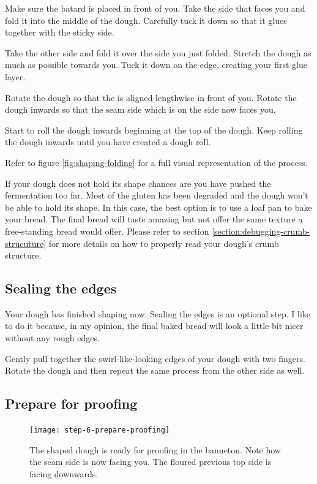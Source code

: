 Make sure the batard is placed in front of you. Take the side
that faces you and fold it into the middle of the dough. Carefully
tuck it down so that it glues together with the sticky side.

Take the other side and fold it over the side you just folded.
Stretch the dough as much as possible towards you. Tuck it down
on the edge, creating your first glue layer.

Rotate the dough so that the is aligned lengthwise in front of you.
Rotate the dough inwards so that the seam side which is on the side
now faces you.

Start to roll the dough inwards beginning at the top of the dough.
Keep rolling the dough inwards until you have created a dough roll.

Refer to figure \ref{fig:shaping-folding} for a full visual
representation of the process.

If your dough does not hold its shape chances are you have pushed
the fermentation too far. Most of the gluten has been degraded
and the dough won't be able to hold its shape. In this case,
the best option is to use a loaf pan to bake your bread. The
final bread will taste amazing but not offer the same texture
a free-standing bread would offer. Please refer to
section \ref{section:debugging-crumb-strucuture} for more
details on how to properly read your dough's crumb structure.

\subsection[Sealing]{Sealing the edges}

Your dough has finished shaping now. Sealing the edges
is an optional step. I like to do it because, in my opinion,
the final baked bread will look a little bit nicer without
any rough edges.

Gently pull together the swirl-like-looking edges of your dough
with two fingers. Rotate the dough and then repeat the same process
from the other side as well.

\subsection[Proofing preparation]{Prepare for proofing}

\begin{figure}[htb!]
  \texttt{[image: step-6-prepare-proofing]}
  \caption{The shaped dough is ready for proofing in the banneton. Note how the seam side
  is now facing you. The floured previous top side is facing downwards.}
  \label{fig:shaping-prepare-proofing}
\end{figure}

